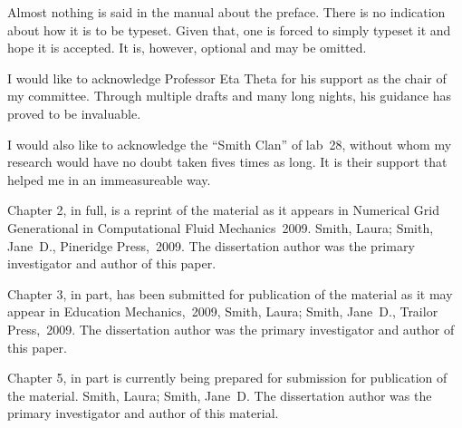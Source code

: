\documentclass[12pt]{ucsddissertation}
\begin{document}
\tableofcontents
\listoffigures
\listoftables

\begin{preface}
Almost nothing is said in the manual about the preface. There is no
indication about how it is to be typeset. Given that, one is forced to
simply typeset it and hope it is accepted. It is, however, optional
and may be omitted.
\end{preface}

\begin{acknowledgements}
I would like to acknowledge Professor Eta Theta for his support as the
chair of my committee. Through multiple drafts and many long nights,
his guidance has proved to be invaluable.

I would also like to acknowledge the ``Smith Clan'' of lab~28, without
whom my research would have no doubt taken fives times as long. It is
their support that helped me in an immeasureable way.

Chapter 2, in full, is a reprint of the material as it appears in
Numerical Grid Generational in Computational Fluid Mechanics~2009.
Smith, Laura; Smith, Jane~D., Pineridge Press,~2009. The dissertation
author was the primary investigator and author of this paper.

Chapter 3, in part, has been submitted for publication of the material
as it may appear in Education Mechanics,~2009, Smith, Laura; Smith,
Jane~D., Trailor Press,~2009. The dissertation author was the primary
investigator and author of this paper.

Chapter 5, in part is currently being prepared for submission for
publication of the material. Smith, Laura; Smith, Jane~D\@. The
dissertation author was the primary investigator and author of this
material.
\end{acknowledgements}
\end{document}
